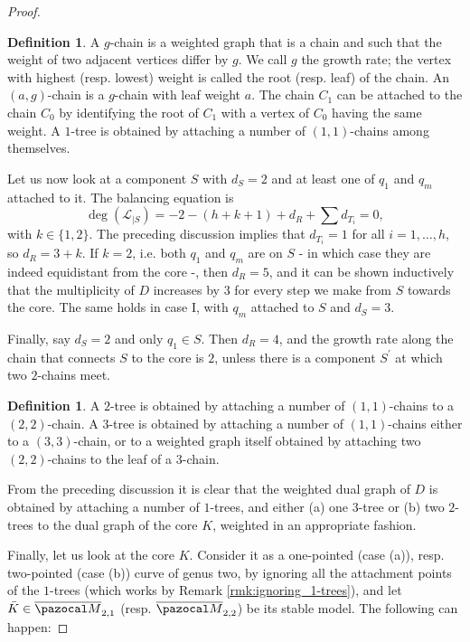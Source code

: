 \documentclass[11pt]{amsart}
\newcommand{\oM}{\overline{\pazocal M}}
\theoremstyle{plain}
\theoremstyle{definition}
\newtheorem{dfn}[thm]{Definition}
\begin{document}
\begin{proof}
\begin{dfn}
 A $g$-chain is a weighted graph that is a chain and such that the weight of two adjacent vertices differ by $g$. We call $g$ the growth rate; the vertex with highest (resp. lowest) weight is called the root (resp. leaf) of the chain. An $(a,g)$-chain is a $g$-chain with leaf weight $a$. The chain $C_1$ can be attached to the chain $C_0$ by identifying the root of $C_1$ with a vertex of $C_0$ having the same weight. A $1$-tree is obtained by attaching a number of $(1,1)$-chains among themselves.
\end{dfn}

Let us now look at a component $S$ with $d_S=2$ and at least one of $q_1$ and $q_m$ attached to it. The balancing equation is
\[\deg(\mathcal L_{|S})= -2-(h+k+1)+d_R+\sum d_{T_i}=0,\]
with $k\in\{1,2\}$. The preceding discussion implies that $d_{T_i}=1$ for all $i=1,\ldots,h$, so $d_R=3+k$. If $k=2$, i.e. both $q_1$ and $q_m$ are on $S$ - in which case they are indeed equidistant from the core -, then $d_R=5$, and it can be shown inductively that the multiplicity of $D$ increases by $3$ for every step we make from $S$ towards the core. The same holds in case I, with $q_m$ attached to $S$ and $d_S=3$.

Finally, say $d_S=2$ and only $q_1\in S$. Then $d_R=4$, and the growth rate along the chain that connects $S$ to the core is $2$, unless there is a component $S^\prime$ at which two $2$-chains meet.

\begin{dfn}
 A $2$-tree is obtained by attaching a number of $(1,1)$-chains to a $(2,2)$-chain. A $3$-tree is obtained by attaching a number of $(1,1)$-chains either to a $(3,3)$-chain, or to a weighted graph itself obtained by attaching two $(2,2)$-chains to the leaf of a $3$-chain.
\end{dfn}

From the preceding discussion it is clear that the weighted dual graph of $D$ is obtained by attaching a number of $1$-trees, and either (a) one $3$-tree or (b) two $2$-trees to the dual graph of the core $K$, weighted in an appropriate fashion.

Finally, let us look at the core $K$. Consider it as a one-pointed (case (a)), resp. two-pointed (case (b)) curve of genus two, by ignoring all the attachment points of the $1$-trees (which works by Remark \ref{rmk:ignoring_1-trees}), and let $\bar K\in\oM_{2,1}$ (resp. $\oM_{2,2}$) be its stable model. The following can happen:


\end{proof}
\end{document}
